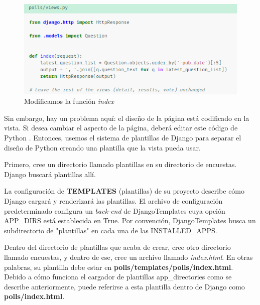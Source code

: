 \documentclass[10pt]{article}
\newcommand{\py}[1]{{\textcolor{B}{Python} #1}}
\newcommand{\django}[1]{{\textcolor{G}{Django} #1}}
\begin{document}
\begin{figure}[H]
\begin{center}
\includegraphics[scale=1]{figuras/3/33/333/img1.png}
\caption{Modificamos la función \textit{index}}
\end{center}
\end{figure}


Sin embargo, hay un problema aquí: el diseño de la página está codificado en la vista. Si desea cambiar el aspecto de la página, deberá editar este código de \py{}. Entonces, usemos el sistema de plantillas de \django{} para separar el diseño de \py{} creando una plantilla que la vista pueda usar.


Primero, cree un directorio llamado plantillas en su directorio de encuestas. \django{} buscará plantillas allí.

La configuración de \textbf{TEMPLATES} (plantillas) de su proyecto describe cómo \django{} cargará y renderizará las plantillas. El archivo de configuración predeterminado configura un \textit{back-end} de \textcolor{G}{DjangoTemplates} cuya opción \textcolor{G}{APP\_DIRS} está establecida en \textcolor{R}{True}. Por convención, \textcolor{G}{DjangoTemplates} busca un subdirectorio de "plantillas" en cada una de las \textcolor{G}{INSTALLED\_APPS}.


Dentro del directorio de plantillas que acaba de crear, cree otro directorio llamado encuestas, y dentro de ese, cree un archivo llamado \textit{index.html}. En otras palabras, su plantilla debe estar en \textbf{polls/templates/polls/index.html}. Debido a cómo funciona el cargador de plantillas \textcolor{G}{app\_directories} como se describe anteriormente, puede referirse a esta plantilla dentro de \django{} como \textbf{polls/index.html}.
\end{document}
